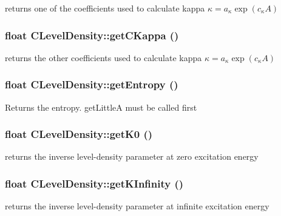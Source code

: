 returns one of the coefficients used to calculate kappa $ \kappa = a_{\kappa} \exp\left(c_{\kappa} A\right) $ 
\subsubsection{\setlength{\rightskip}{0pt plus 5cm}float CLevel\-Density::get\-CKappa ()\hspace{0.3cm}{\tt  [static]}}\label{classCLevelDensity_d761161ac6272d6efb58796825fa7000}


returns the other coefficients used to calculate kappa $ \kappa = a_{\kappa} \exp\left(c_{\kappa} A\right) $ 
\subsubsection{\setlength{\rightskip}{0pt plus 5cm}float CLevel\-Density::get\-Entropy ()}\label{classCLevelDensity_f3c8dae34c2de62646d0061cbb6bbe82}


Returns the entropy. get\-Little\-A must be called first 
\subsubsection{\setlength{\rightskip}{0pt plus 5cm}float CLevel\-Density::get\-K0 ()\hspace{0.3cm}{\tt  [static]}}\label{classCLevelDensity_e5bec4da4e010b19a0d092056fecaf7f}


returns the inverse level-density parameter at zero excitation energy 
\subsubsection{\setlength{\rightskip}{0pt plus 5cm}float CLevel\-Density::get\-KInfinity ()\hspace{0.3cm}{\tt  [static]}}\label{classCLevelDensity_f27496e4e8611b3509a7e70efa33508b}


returns the inverse level-density parameter at infinite excitation energy 
